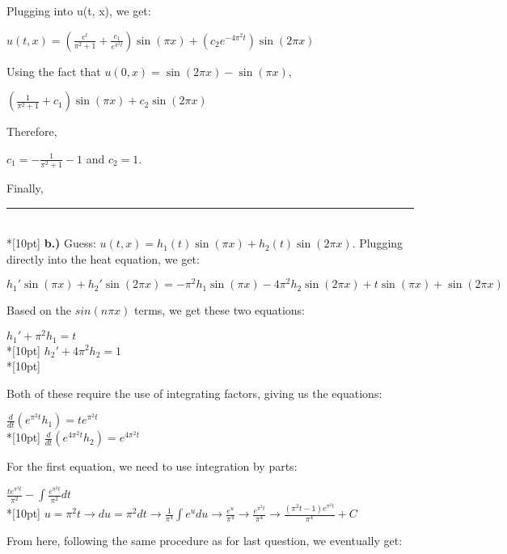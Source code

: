 \documentclass{article}
\begin{document}
Plugging into u(t, x), we get: 
\begin{center}
    \(\displaystyle u(t, x) = (\frac{e^t}{\pi^2 + 1} + \frac{c_1}{e^{\pi^2t}})\sin(\pi x) + (c_2e^{-4\pi^2t})\sin(2\pi x)\)
\end{center}
Using the fact that \(u(0, x) = \sin (2\pi x) - \sin (\pi x)\),
\begin{center}
    \(\displaystyle (\frac{1}{\pi^2 + 1} + c_1)\sin(\pi x) + c_2\sin(2\pi x)\)
\end{center}
\clearpage \noindent
Therefore,
\begin{center}
    \(\displaystyle c_1 = -\frac{1}{\pi^2 + 1} - 1\) and \(c_2 = 1\).
\end{center}
Finally,
\begin{center}
\end{center}   
\rule{\linewidth}{0.2mm}\\*[10pt]
\textbf{b.)} Guess: \(u(t, x) = h_1(t)\sin(\pi x) + h_2(t)\sin(2\pi x)\). Plugging directly into the heat equation, we get:
\begin{center}
    \(\displaystyle h_1'\sin(\pi x) + h_2'\sin(2\pi x) = -\pi^2h_1\sin(\pi x) -4\pi^2h_2\sin(2\pi x) + t\sin(\pi x) + \sin(2\pi x)\)
\end{center}
Based on the \(sin(n\pi x)\) terms, we get these two equations:
\begin{center}
    \(h_1' + \pi^2h_1 = t\)\\*[10pt]
    \(h_2' + 4\pi^2h_2 = 1\)\\*[10pt]
\end{center}
Both of these require the use of integrating factors, giving us the equations:
\begin{center}
    \(\displaystyle\frac{d}{dt}(e^{\pi^2t}h_1) = te^{\pi^2t}\)\\*[10pt]
    \(\displaystyle\frac{d}{dt}(e^{4\pi^2t}h_2) = e^{4\pi^2t}\)
\end{center}
For the first equation, we need to use integration by parts:
\begin{center}
    \(\displaystyle\frac{te^{\pi^2t}}{\pi^2}-\int\frac{e^{\pi^2t}}{\pi^2}dt\)\\*[10pt]
    \(\displaystyle u = \pi^2t\rightarrow du = \pi^2dt\rightarrow\frac{1}{\pi^4}\int e^udu\rightarrow \frac{e^u}{\pi^4}\rightarrow\frac{e^{\pi^2t}}{\pi^4}\rightarrow\frac{(\pi^2t-1)e^{\pi^2t}}{\pi^4}+C\)
\end{center}
From here, following the same procedure as for last question, we eventually get:
\end{document}
